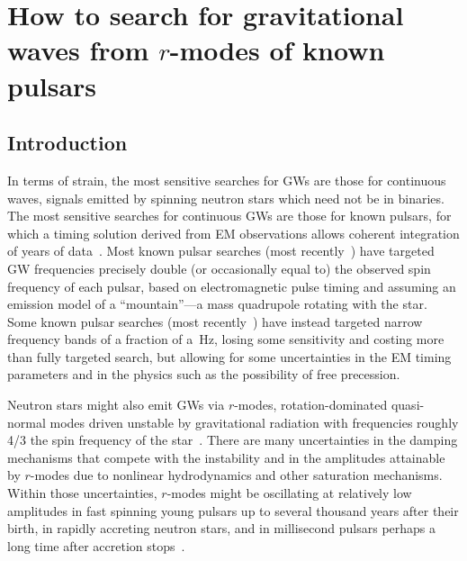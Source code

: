 \documentclass{ttuthes2007}
\begin{document}

\chapter{\textbf{How to search for gravitational waves from $r$-modes of known
pulsars}}\label{Chapter:4}
\section{Introduction}
In terms of strain, the most sensitive searches for \acp{GW} are those for
continuous waves, signals emitted by spinning neutron stars which need not be
in binaries.
The most sensitive searches for continuous \acp{GW} are those for known
pulsars, for which a timing solution derived from \ac{EM} observations
allows coherent integration of years of data~\cite[and references
therein]{Riles:2017evm}.
Most known pulsar searches (most recently~\cite{Authors:2019ztc}) have
targeted \ac{GW} frequencies precisely double (or occasionally equal to) the
observed spin frequency of each pulsar, based on electromagnetic pulse timing
and assuming an emission model of a ``mountain''---a mass quadrupole rotating
with the star.
Some known pulsar searches (most recently~\cite{Abbott:2019bed}) have instead
targeted narrow frequency bands of a fraction of a~Hz, losing some sensitivity
and costing more than fully targeted search, but allowing for some
uncertainties in the \ac{EM} timing parameters and in the physics such as the
possibility of free precession.

Neutron stars might also emit \acp{GW} via $r$-modes, rotation-dominated
quasi-normal modes driven unstable by gravitational radiation with frequencies
roughly 4/3 the spin frequency of the star~\cite[and references
therein]{Paschalidis:2016vmz}.
There are many uncertainties in the damping mechanisms that compete with the
instability and in the amplitudes attainable by $r$-modes due to nonlinear
hydrodynamics and other saturation mechanisms.
Within those uncertainties, $r$-modes might be oscillating at relatively low
amplitudes in fast spinning young pulsars up to several thousand years after
their birth, in rapidly accreting neutron stars, and in millisecond pulsars
perhaps a long time after accretion stops~\cite[and references
therein]{Glampedakis:2017nqy}.
\end{document}
